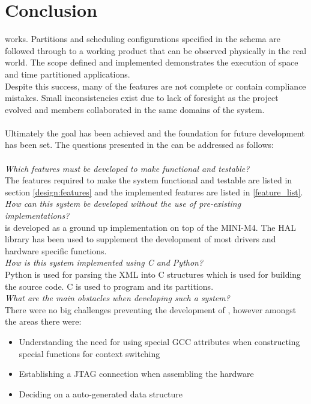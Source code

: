 \chapter{Conclusion}

\OSname{} works. 
Partitions and scheduling configurations specified 
in the schema are followed through to a working 
product that can be observed physically in the real world. 
The scope defined and implemented demonstrates the 
execution of space and time partitioned applications.
\\
Despite this success, many of the features are not 
complete or contain compliance mistakes. 
Small inconsistencies exist due to lack of foresight
as the project evolved and members collaborated 
in the same domains of the system.
\\\\
Ultimately the goal has been achieved and the 
foundation for future development has been set.
The questions presented in the  can be addressed as follows:
\\\\
\textit{Which features must be developed to make \OSname{} functional and
testable?}\\
The features required to make the system functional and testable are listed in  section \ref{design:features}
and the implemented features are listed in \ref{feature_list}.\\

\textit{How can this system be developed without the use of pre-existing
implementations?}\\
\OSname{} is developed as a ground up implementation on top of the MINI-M4.
The HAL library has been used to supplement the development of most drivers and hardware specific functions.\\

\textit{How is this system implemented using C and Python?}\\
Python is used for parsing the XML into C structures which is used for building the source code.
C is used to program \OSname{} and its partitions.\\

\textit{What are the main obstacles when developing such a system?}\\
There were no big challenges preventing the development of \OSname{},
however amongst the areas there were:
\begin{itemize}
	\item Understanding the need for using special GCC attributes when constructing special functions for context switching
	\item Establishing a JTAG connection when assembling the hardware
	\item Deciding on a auto-generated data structure
\end{itemize}

